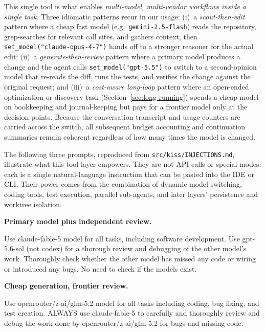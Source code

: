 \documentclass{article}
\newenvironment{promptbox}{%
  \begin{mdframed}[
    linewidth=0.4pt,
    linecolor=black,
    innerleftmargin=5pt,
    innerrightmargin=5pt,
    innertopmargin=5pt,
    innerbottommargin=5pt,
    skipabove=2pt,
    skipbelow=5pt]
  \setlength{\parskip}{0pt}\setlength{\parindent}{0pt}%
  \ttfamily\scriptsize\raggedright\frenchspacing\obeylines\leavevmode\strut\ignorespaces
}{%
  \end{mdframed}
}
\begin{document}
This single tool is what enables \emph{multi-model, multi-vendor workflows inside a single task}.  Three idiomatic patterns recur in our usage: (i)~a \emph{scout-then-edit} pattern where a cheap fast model (e.g.\ \texttt{gemini-2.5-flash}) reads the repository, grep-searches for relevant call sites, and gathers context, then \texttt{set\_model("claude-opus-4-7")} hands off to a stronger reasoner for the actual edit; (ii)~a \emph{generate-then-review} pattern where a primary model produces a change and the agent calls \texttt{set\_model("gpt-5.5")} to switch to a second-opinion model that re-reads the diff, runs the tests, and verifies the change against the original request; and (iii)~a \emph{cost-aware long-loop} pattern where an open-ended optimization or discovery task (Section~\ref{sec:long-running}) spends a cheap model on bookkeeping and journal-keeping but pays for a frontier model only at the decision points.  Because the conversation transcript and usage counters are carried across the switch, all subsequent budget accounting and continuation summaries remain coherent regardless of how many times the model is changed.

The following three prompts, reproduced from \texttt{src/kiss/INJECTIONS.md}, illustrate what this tool layer empowers.  They are not API calls or special modes: each is a single natural-language instruction that can be pasted into the IDE or CLI.  Their power comes from the combination of dynamic model switching, coding tools, test execution, parallel sub-agents, and later layers' persistence and worktree isolation.

\noindent\textbf{Primary model plus independent review.}\par\vspace{1pt}
\begin{promptbox}%
Use claude-fable-5 model for all tasks, including software
development. Use gpt-5.6-sol (not codex) for a thorough review
and debugging of the other model's work. Thoroughly check
whether the other model has missed any code or wiring or
introduced any bugs. No need to check if the models exist.%
\end{promptbox}

\noindent\textbf{Cheap generation, frontier review.}\par\vspace{1pt}
\begin{promptbox}%
Use openrouter/z-ai/glm-5.2 model for all tasks including
coding, bug fixing, and test creation. ALWAYS use claude-fable-5
to carefully and thoroughly review and debug the work done by
openrouter/z-ai/glm-5.2 for bugs and missing code.%
\end{promptbox}
\end{document}
